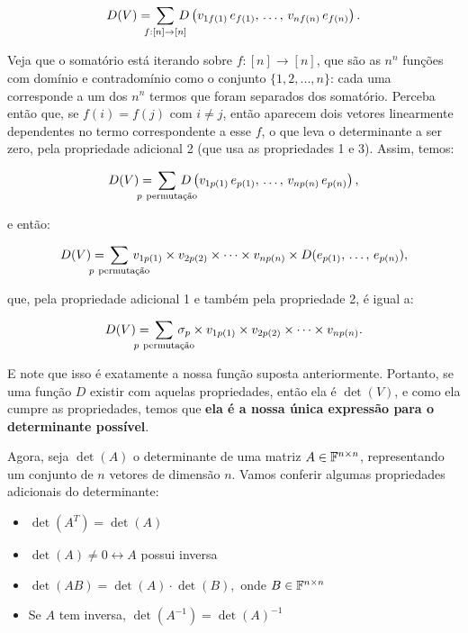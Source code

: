 \documentclass[11pt, a4paper]{article}
\begin{document}
\void[-0.8]

\[
D(V) = \tb[-0.8]\sum_{f:[n]\to[n]}\tb[-0.8] D\left(v_{1f(1)}\,e_{f(1)},\,\dots,\, v_{nf(n)}\,e_{f(n)}\right).
\]

\void[-0.6]

Veja que o somatório está iterando sobre \(f:[n] \rightarrow [n]\), que são as \(n^n\) funções com domínio e contradomínio como o conjunto \(\{1,2,...,n\}\): cada uma corresponde a um dos \(n^n\) termos que foram separados dos somatório. Perceba então que, se \(f(i) = f(j)\) com \(i \ne j\), então aparecem dois vetores linearmente dependentes no termo correspondente a esse \(f\), o que leva o determinante a ser zero, pela propriedade adicional 2 (que usa as propriedades 1 e 3). Assim, temos:

\[
D(V) = \tb[-1.5]\sum_{p\ \text{permutação}}\tb[-1.5] D\left(v_{1p(1)}\,e_{p(1)},\,\dots,\, v_{np(n)}\,e_{p(n)}\right),
\]

\void[-0.8]

e então:

\void[-1.5]

\[
D(V) = \tb[-1.5]\sum_{p\ \text{permutação}}\tb[-1.5] v_{1p(1)} \times v_{2p(2)} \times \dots \times v_{np(n)} \times D(e_{p(1)},\,\dots,\,e_{p(n)}),
\]

\void[-0.5]

que, pela propriedade adicional 1 e também pela propriedade 2, é igual a:

\void[-1]

\[
D(V) = \tb[-1.5]\sum_{p\ \text{permutação}}\tb[-1.5] \sigma_p \times v_{1p(1)} \times v_{2p(2)} \times \dots \times v_{np(n)}.
\]

\void[-0.8]

E note que isso é exatamente a nossa função suposta anteriormente. Portanto, se uma função \(D\) existir com aquelas propriedades, então ela é \(\det(V)\), e como ela cumpre as propriedades, temos que \textbf{ela é a nossa única expressão para o determinante possível}.

Agora, seja \(\det(A)\) o determinante de uma matriz \(A \in \AlgBody^{n\times n}\), representando um conjunto de \(n\) vetores de dimensão \(n\). Vamos conferir algumas propriedades adicionais do determinante:

\begin{itemize}
    \item \(\det(A^T)=\det(A)\)
    \item \(\det(A)\ne0 \leftrightarrow A\) possui inversa
    \item \(\det(AB)=\det(A)\cdot \det(B),\) onde \(B \in \AlgBody^{n\times n}\)
    \item Se \(A\) tem inversa, \(\det(A^{-1})=\det(A)^{-1}\)
\end{itemize}
\end{document}

